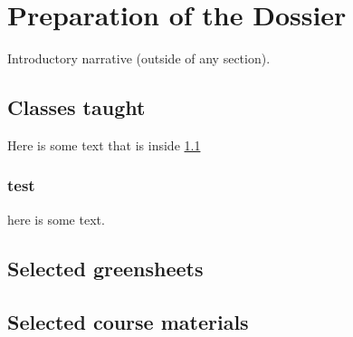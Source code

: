 \chapter{Preparation of the Dossier} \label{tab1}
\minitoc 

Introductory narrative (outside of any section).

\section{Classes taught} \label{sec:courses_taught}
Here is some text that is inside \ref{sec:courses_taught}
\subsection{test}
here is some text.

\section{Selected greensheets} \label{sec:greensheets}


\section{Selected course materials}

